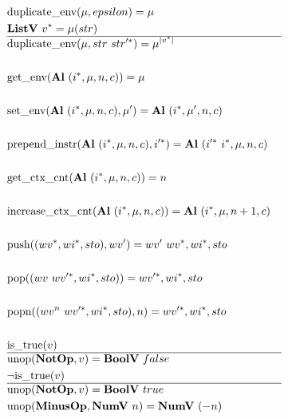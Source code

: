 \begin{align*}
%
\newline \\
  &\duplicateenv(\mu, epsilon) = \mu \\
  &\listv ~ \seq v = \mu(str) \\
  \hline
  &\duplicateenv(\mu, str ~ \seq{str'}) = \mu^{|\seq v|} \\
%
\newline \\
  &\getenv(\al ~ (\seq i, \mu, n, c)) = \mu \\
%
\newline \\
  &\setenv(\al ~ (\seq i, \mu, n, c), \mu') = \al ~ (\seq i, \mu', n, c) \\
%
\newline \\
  &\prependinstr(\al ~ (\seq i, \mu, n, c), \seq{i'}) = \al ~ (\seq{i'} ~ \seq i, \mu, n, c) \\
%
\newline \\
  &\getctxcnt(\al ~ (\seq i, \mu, n, c)) = n \\
%
\newline \\
  &\increasectxcnt(\al ~ (\seq i, \mu, n, c)) = \al ~ (\seq i, \mu, n + 1, c) \\
%
\newline \\
  &\push((\seq{wv}, \seq{wi}, sto), wv') = wv' ~ \seq{wv}, \seq{wi}, sto \\
%
\newline \\
  &\pop((wv ~ \seq{wv'}, \seq{wi}, sto)) = \seq{wv'}, \seq{wi}, sto \\
%
\newline \\
  &\popn((wv^n ~ \seq{wv'}, \seq{wi}, sto), n) = \seq{wv'}, \seq{wi}, sto \\
%
\newline \\
  &\istrue(v) \\
  \hline
  &\unop(\notop, v) = \boolv ~ false \\
  &\neg\istrue(v) \\
  \hline
  &\unop(\notop, v) = \boolv ~ true \\
  &\unop(\minusop, \numv ~ n) = \numv ~ (-n) \\

\end{align*}
